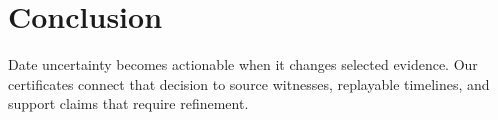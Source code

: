 \section{Conclusion}
Date uncertainty becomes actionable when it changes selected evidence.
Our certificates connect that decision to source witnesses, replayable timelines, and support claims that require refinement.
